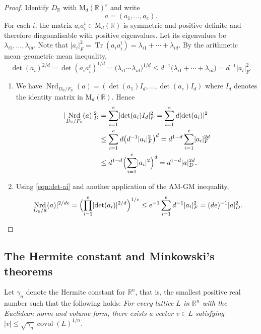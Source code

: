 \documentclass[11pt]{article}
\numberwithin{equation}{section}
\newenvironment{enumeratei}
{\bgroup\def\theenumi{\roman{enumi}}\def\theenumii{\alph{enumii}}\begin{enumerate}}
{\end{enumerate}\egroup}
\newcommand{\bR}{\mathbb{R}}
\newcommand{\rM}{\mathrm{M}}
\DeclareMathOperator{\covol}{covol}
\DeclareMathOperator{\Nrd}{Nrd}
\DeclareMathOperator{\Tr}{Tr}
\newcommand{\abs}[1]{\lvert #1 \rvert}
\begin{document}
\begin{proof}
Identify $D_\bR$ with $\rM_d(\bR)^e$ and write
\[
a = (a_1, \dotsc, a_e).
\]
For each $i$, the matrix $a_i a_i^t \in \rM_d(\bR)$ is symmetric and positive definite and therefore diagonalisable with positive eigenvalues. Let its eigenvalues be $\lambda_{i1}, \dotsc, \lambda_{id}$.
Note that $\abs{a_i}_F^2 = \Tr(a_i a_i^t) = \lambda_{i1} + \dotsb + \lambda_{id}$.
By the arithmetic mean--geometric mean inequality,
\begin{equation} \label{eqn:det-ai}
\det(a_i)^{2/d} = \det(a_i a_i^t)^{1/d} = \bigl( \lambda_{i1} \dotsm \lambda_{id} \bigr)^{1/d} \leq d^{-1} \bigl( \lambda_{i1} + \dotsb + \lambda_{id} \bigr) = d^{-1} \abs{a_i}_F^2.
\end{equation}

\begin{enumeratei}
\item We have $\Nrd_{D_\bR/F_\bR}(a) = (\det(a_1) I_d, \dotsc, \det(a_e)I_d)$ where $I_d$ denotes the identity matrix in $\rM_d(\bR)$.
Hence
\begin{align*}
\abs{\Nrd_{D_\bR/F_\bR}(a)}_D^2
& = \sum_{i=1}^e \abs{\det(a_i) I_d}_F^2
= \sum_{i=1}^e d \abs{\det(a_i)}^2
\\& \leq \sum_{i=1}^e d \bigl( d^{-1} \abs{a_i}_F^2 \bigr)^{d}
= d^{1-d} \sum_{i=1}^e \abs{a_i}_F^{2d}
\\& \leq d^{1-d} \Bigl( \sum_{i=1}^e \abs{a_i}^2 \Bigr)^d
= d^{1-d} \abs{a}_D^{2d}.
\end{align*}

\item Using \eqref{eqn:det-ai} and another application of the AM-GM inequality,
\[
\abs{\Nrd_{D_\bR/\bR}(a)}^{2/de} = \Bigl( \prod_{i=1}^e \abs{\det(a_i)}^{2/d} \Bigr)^{1/e}
\leq e^{-1} \sum_{i=1}^e d^{-1} \abs{a_i}_F^2 = (de)^{-1} \abs{a}_D^2.
\qedhere
\]
\end{enumeratei}
\end{proof}

\subsection{The Hermite constant and Minkowski's theorems}

Let $\gamma_n$ denote the Hermite constant for $\bR^n$, that is, the smallest positive real number such that the following holds:
\textit{For every lattice $L$ in $\bR^n$ with the Euclidean norm and volume form, there exists a vector $v \in L$ satisfying $\abs{v} \leq \sqrt{\gamma_n} \covol(L)^{1/n}$.}
\end{document}
